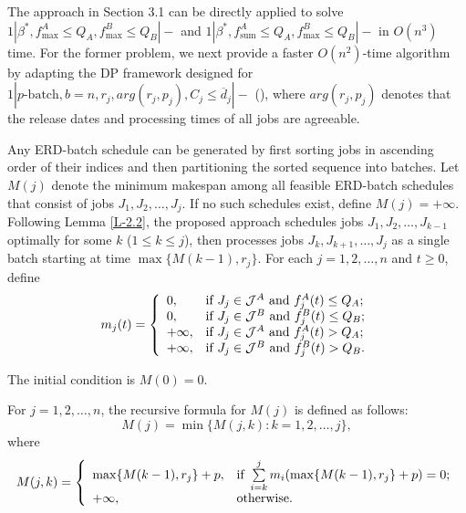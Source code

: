\documentclass[12pt]{article}
\begin{document}
\begin{sloppypar}
The approach in Section 3.1 can be directly applied to solve $1 | \beta^{*}, f_{\max}^A \leq Q_A, f_{\max}^B \leq Q_B |-$ and $1 | \beta^{*}, f_{\mathrm{sum}}^A \leq Q_A, f_{\max}^B \leq Q_B |-$ in $O(n^3)$ time. For the former problem, we next provide a faster $O(n^2)$-time algorithm by adapting the  DP framework designed for $1 | p\text{-batch}, b = n, r_j, arg(r_j, p_j), C_j \leq \overline{d}_j|-$ (\citealp{ChengLiuYU2001IIE}), where $arg(r_j, p_j)$ denotes that the release dates and processing times of all jobs are agreeable.

Any ERD-batch schedule can be generated by first sorting jobs in ascending order of their indices and then partitioning the sorted sequence into batches. Let $M(j)$ denote the minimum makespan among all feasible ERD-batch schedules that consist of jobs $J_1, J_2, \ldots, J_j$. If no such schedules exist, define $M(j)=+\infty$. Following Lemma \ref{L-2.2}, the proposed approach schedules jobs $J_1, J_2, \ldots, J_{k-1}$ optimally for some $k$ ($1 \leq k \leq j$), then processes jobs $J_k, J_{k+1}, \ldots, J_j$ as a single batch starting at time $\max \{M(k-1), r_j\}$. For each $j=1, 2, \ldots, n$ and $t \geq 0$, define
\begin{equation*}\label{E-3.3}
m_j(t)=\left\{
\begin{array}{ll}
0, & \hbox{if} ~ J_j \in \mathcal{J}^A ~ \hbox{and} ~ f_j^A(t) \leq Q_A; \\
0, & \hbox{if} ~ J_j \in \mathcal{J}^B ~ \hbox{and} ~ f_j^B(t) \leq Q_B;\\
+\infty, & \hbox{if} ~ J_j \in \mathcal{J}^A ~ \hbox{and} ~ f_j^A(t) > Q_A;\\
+\infty, & \hbox{if} ~ J_j \in \mathcal{J}^B ~ \hbox{and} ~ f_j^B(t) > Q_B.
\end{array}
\right.
\end{equation*}

The initial condition is $M(0)=0$. 

For $j=1, 2, \ldots, n$, the recursive formula for $M(j)$ is defined as follows:
\begin{equation*}\label{E-3.4}
M(j)=\min\{M(j, k): k=1, 2, \ldots, j\},
\end{equation*}
where
\begin{equation*}\label{E-3.5}
M(j, k)=\left\{
\begin{array}{ll}
\max \{M(k-1), r_j\}+p, & \hbox{if}~ \sum\limits_{i=k}^j m_i(\max \{M(k-1), r_j\}+p)=0; \\
+\infty, & \hbox{otherwise.}
\end{array}
\right.
\end{equation*}


\end{sloppypar}
\end{document}
